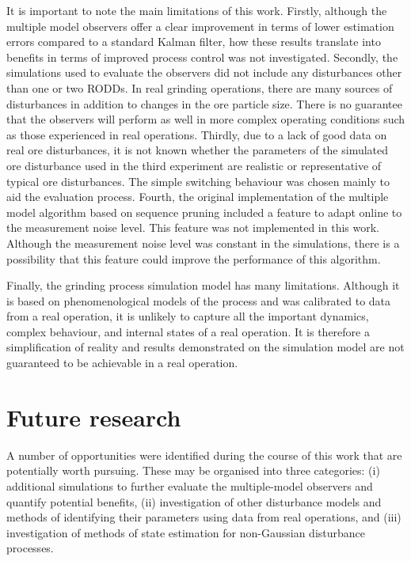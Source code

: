 It is important to note the main limitations of this work. Firstly, although the multiple model observers offer a clear improvement in terms of lower estimation errors compared to a standard Kalman filter, how these results translate into benefits in terms of improved process control was not investigated. Secondly, the simulations used to evaluate the observers did not include any disturbances other than one or two \gls{RODD}s. In real grinding operations, there are many sources of disturbances in addition to changes in the ore particle size. There is no guarantee that the observers will perform as well in more complex operating conditions such as those experienced in real operations. Thirdly, due to a lack of good data on real ore disturbances, it is not known whether the parameters of the simulated ore disturbance used in the third experiment are realistic or representative of typical ore disturbances. The simple switching behaviour was chosen mainly to aid the evaluation process. Fourth, the original implementation of the multiple model algorithm based on sequence pruning \citep{eriksson_classification_1996} included a feature to adapt online to the measurement noise level. This feature was not implemented in this work. Although the measurement noise level was constant in the simulations, there is a possibility that this feature could improve the performance of this algorithm.

Finally, the grinding process simulation model has many limitations. Although it is based on phenomenological models of the process and was calibrated to data from a real operation, it is unlikely to capture all the important dynamics, complex behaviour, and internal states of a real operation. It is therefore a simplification of reality and results demonstrated on the simulation model are not guaranteed to be achievable in a real operation.

\section*{Future research} \label{sec:future-research}

A number of opportunities were identified during the course of this work that are potentially worth pursuing. These may be organised into three categories: (i) additional simulations to further evaluate the multiple-model observers and quantify potential benefits, (ii) investigation of other disturbance models and methods of identifying their parameters using data from real operations, and (iii) investigation of methods of state estimation for non-Gaussian disturbance processes.

